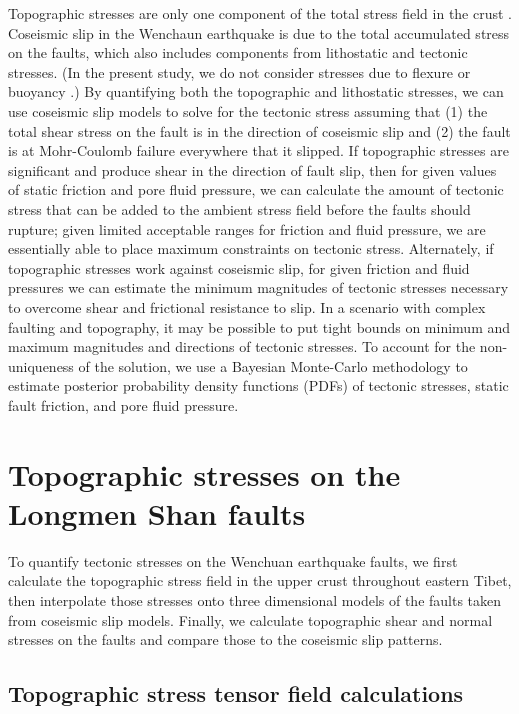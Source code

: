 \documentclass[twocolumn,jgrga]{AGUTeX}
\begin{document}
\begin{article}
Topographic stresses are only one component of the total stress field in
the crust \citep{molnar1988}. Coseismic slip in the Wenchaun earthquake
is due to the total accumulated stress on the faults, which also
includes components from lithostatic and tectonic stresses. (In the
present study, we do not consider stresses due to flexure \citep[e.g.,][]
{luttrell2007} or buoyancy \citep[e.g.,][]{luttrell2011}.) By quantifying
both the topographic and lithostatic stresses, we can use coseismic slip
models to solve for the tectonic stress assuming that (1) the total
shear stress on the fault is in the direction of coseismic slip \citep[e.g.,]
[]{angelier1994} and (2) the fault is at Mohr-Coulomb failure everywhere
that it slipped. If topographic stresses are significant and produce
shear in the direction of fault slip, then for given values of static
friction and pore fluid pressure, we can calculate the amount of
tectonic stress that can be added to the ambient stress field before the
faults should rupture; given limited acceptable ranges for friction and
fluid pressure, we are essentially able to place maximum constraints on
tectonic stress. Alternately, if topographic stresses work against
coseismic slip, for given friction and fluid pressures we can estimate
the minimum magnitudes of tectonic stresses necessary to overcome shear
and frictional resistance to slip. In a scenario with complex faulting
and topography, it may be possible to put tight bounds on minimum and
maximum magnitudes and directions of tectonic stresses. To account for
the non-uniqueness of the solution, we use a Bayesian Monte-Carlo
methodology to estimate posterior probability density functions (PDFs)
of tectonic stresses, static fault friction, and pore fluid pressure.

\section{Topographic stresses on the Longmen Shan
faults}\label{topographic-stresses-on-the-longmen-shan-faults}

To quantify tectonic stresses on the Wenchuan earthquake faults, we
first calculate the topographic stress field in the upper crust
throughout eastern Tibet, then interpolate those stresses onto three
dimensional models of the faults taken from coseismic slip models.
Finally, we calculate topographic shear and normal stresses on the
faults and compare those to the coseismic slip patterns.

\subsection{Topographic stress tensor field
calculations}\label{topographic-stress-tensor-field-calculations}


\end{article}
\end{document}
